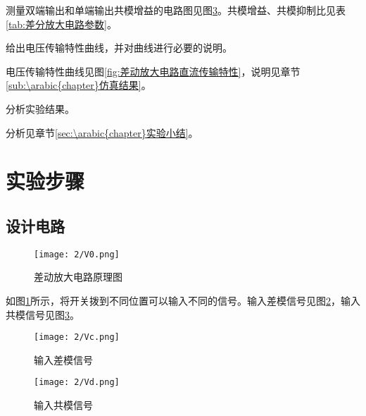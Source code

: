 \begin{Answer}
	测量双端输出和单端输出共模增益的电路图见图\ref{fig:输入共模信号}。共模增益、共模抑制比见表\ref{tab:差分放大电路参数}。
\end{Answer}

\begin{Exercise}
	给出电压传输特性曲线，并对曲线进行必要的说明。
\end{Exercise}

\begin{Answer}
	电压传输特性曲线见图\ref{fig:差动放大电路直流传输特性}，说明见章节\ref{sub:\arabic{chapter}仿真结果}。
\end{Answer}

\begin{Exercise}
	分析实验结果。
\end{Exercise}

\begin{Answer}
	分析见章节\ref{sec:\arabic{chapter}实验小结}。
\end{Answer}

\section{实验步骤}%
\label{sec:\arabic{chapter}实验步骤}

\subsection{设计电路}%
\label{sub:\arabic{chapter}设计电路}

\begin{figure}[H]
	\centering
	\texttt{[image: 2/V0.png]}
	\caption{差动放大电路原理图}
	\label{fig:差动放大电路原理图}
\end{figure}

如图\ref{fig:差动放大电路原理图}所示，将开关拨到不同位置可以输入不同的信号。输入差模信号见图\ref{fig:输入差模信号}，输入共模信号见图\ref{fig:输入共模信号}。

\begin{figure}[H]
	\centering
	\texttt{[image: 2/Vc.png]}
	\caption{输入差模信号}
	\label{fig:输入差模信号}
\end{figure}

\begin{figure}[H]
	\centering
	\texttt{[image: 2/Vd.png]}
	\caption{输入共模信号}
	\label{fig:输入共模信号}
\end{figure}

